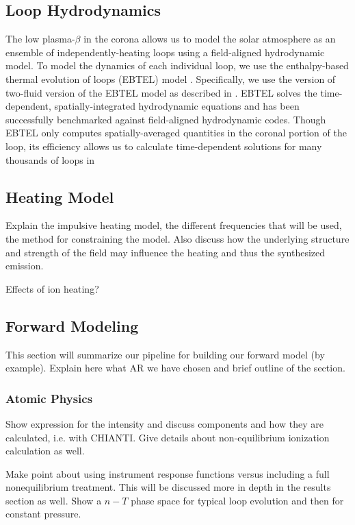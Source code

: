 \documentclass[modern,linenumbers]{aastex62}
\begin{document}
\subsection{Loop Hydrodynamics}
\label{loops}
The low plasma-$\beta$ in the corona allows us to model the solar atmosphere as an ensemble of independently-heating loops using a field-aligned hydrodynamic model. To model the dynamics of each individual loop, we use the enthalpy-based thermal evolution of loops (EBTEL) model \citep{klimchuk_highly_2008,cargill_enthalpy-based_2012}. Specifically, we use the version of two-fluid version of the EBTEL model as described in \citep{barnes_inference_2016}. EBTEL solves the time-dependent, spatially-integrated hydrodynamic equations and has been successfully benchmarked against field-aligned hydrodynamic codes. Though EBTEL only computes spatially-averaged quantities in the coronal portion of the loop, its efficiency allows us to calculate time-dependent solutions for many thousands of loops in 


\subsection{Heating Model}
\label{heating}
Explain the impulsive heating model, the different frequencies that will be used, the method for constraining the model. Also discuss how the underlying structure and strength of the field may influence the heating and thus the synthesized emission.

Effects of ion heating?

\subsection{Forward Modeling}
\label{forward}
This section will summarize our pipeline for building our forward model (by example). Explain here what AR we have chosen and brief outline of the section.

\subsubsection{Atomic Physics}
\label{atomic}
Show expression for the intensity and discuss components and how they are calculated, i.e. with CHIANTI. Give details about non-equilibrium ionization calculation as well.

Make point about using instrument response functions versus including a full nonequilibrium treatment. This will be discussed more in depth in the results section as well. Show a $n-T$ phase space for typical loop evolution and then for constant pressure.
\end{document}
